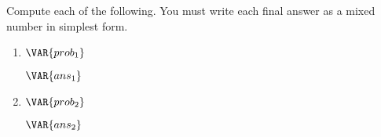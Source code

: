
Compute each of the following. You must write each final answer as a mixed number in simplest form.


\begin{enumerate}
    \item $\VAR{prob_1}$

    \begin{ansenv}
        \vspace{20pt}
        $\VAR{ans_1}$
    \end{ansenv}
    \vfill

    \item $\VAR{prob_2}$

    \begin{ansenv}
        \vspace{20pt}
        $\VAR{ans_2}$
    \end{ansenv}
    \vfill

\end{enumerate}

\trueemptypage